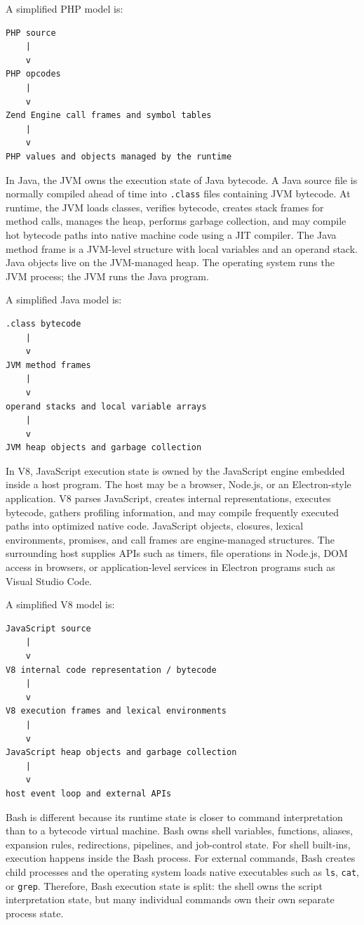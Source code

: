 \documentclass[a4paper,twoside]{report}
\begin{document}
A simplified PHP model is:

\begin{verbatim}
PHP source
    |
    v
PHP opcodes
    |
    v
Zend Engine call frames and symbol tables
    |
    v
PHP values and objects managed by the runtime
\end{verbatim}

In Java, the JVM owns the execution state of Java bytecode. A Java source file is normally compiled ahead of time into \texttt{.class} files containing JVM bytecode. At runtime, the JVM loads classes, verifies bytecode, creates stack frames for method calls, manages the heap, performs garbage collection, and may compile hot bytecode paths into native machine code using a JIT compiler. The Java method frame is a JVM-level structure with local variables and an operand stack. Java objects live on the JVM-managed heap. The operating system runs the JVM process; the JVM runs the Java program.

A simplified Java model is:

\begin{verbatim}
.class bytecode
    |
    v
JVM method frames
    |
    v
operand stacks and local variable arrays
    |
    v
JVM heap objects and garbage collection
\end{verbatim}

In V8, JavaScript execution state is owned by the JavaScript engine embedded inside a host program. The host may be a browser, Node.js, or an Electron-style application. V8 parses JavaScript, creates internal representations, executes bytecode, gathers profiling information, and may compile frequently executed paths into optimized native code. JavaScript objects, closures, lexical environments, promises, and call frames are engine-managed structures. The surrounding host supplies APIs such as timers, file operations in Node.js, DOM access in browsers, or application-level services in Electron programs such as Visual Studio Code.

A simplified V8 model is:

\begin{verbatim}
JavaScript source
    |
    v
V8 internal code representation / bytecode
    |
    v
V8 execution frames and lexical environments
    |
    v
JavaScript heap objects and garbage collection
    |
    v
host event loop and external APIs
\end{verbatim}

Bash is different because its runtime state is closer to command interpretation than to a bytecode virtual machine. Bash owns shell variables, functions, aliases, expansion rules, redirections, pipelines, and job-control state. For shell built-ins, execution happens inside the Bash process. For external commands, Bash creates child processes and the operating system loads native executables such as \texttt{ls}, \texttt{cat}, or \texttt{grep}. Therefore, Bash execution state is split: the shell owns the script interpretation state, but many individual commands own their own separate process state.
\end{document}
